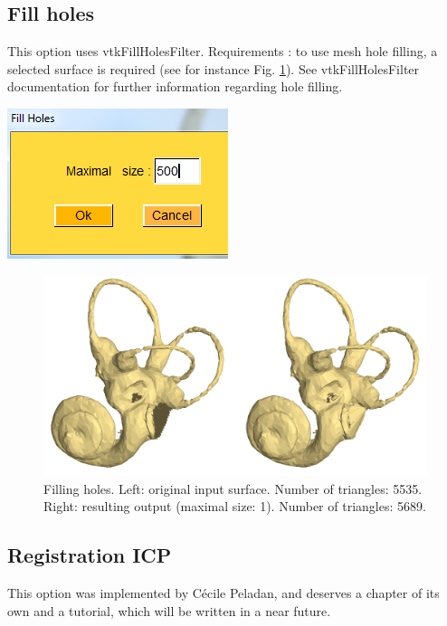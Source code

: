 \subsection{Fill holes}

\noindent
\begin{minipage}{0.5\textwidth}

This option uses vtkFillHolesFilter.
Requirements : to use mesh hole filling, a selected surface is
required (see for instance Fig. \ref{fill_holes}). See vtkFillHolesFilter documentation for further
information regarding hole filling.


\end{minipage}    
\begin{minipage}{0.5\textwidth}\centering
  \includegraphics[scale=0.5]{images/Edit_selected_objects/09_fill_holes.png}
 \end{minipage} 
\noindent

\begin{figure}
  \centering
  \includegraphics[scale=0.25]{images/Edit_selected_objects/09_fill_holes_input_output.png} 
	\caption{Filling holes. Left: original input surface. Number of triangles: 5535. Right: resulting output (maximal size: 1). Number of triangles: 5689.}
\label{fill_holes}
 
\end{figure}


\subsection{Registration ICP}
This option was implemented by Cécile Peladan, and deserves a chapter of its own and a tutorial, which will be written in a near future. 

